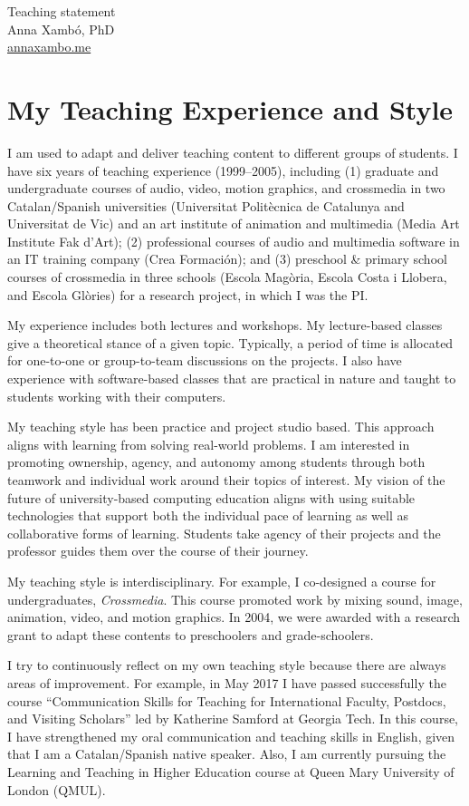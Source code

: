 \documentclass[10pt, a4paper]{article}
\begin{document}
{\LARGE Teaching statement}\\[0.2cm]
Anna Xambó, PhD\\
\href{http://annaxambo.me}{annaxambo.me}

\section*{My Teaching Experience and Style}

I am used to adapt and deliver teaching content to different groups of students. I have six years of teaching experience (1999--2005), including (1) graduate and undergraduate courses of audio, video, motion graphics, and crossmedia in two Catalan/Spanish universities (Universitat Politècnica de Catalunya and Universitat de Vic) and an art institute of animation and multimedia (Media Art Institute Fak d’Art); (2) professional courses of audio and multimedia software in an IT training company (Crea Formación); and (3) preschool \& primary school courses of crossmedia in three schools (Escola Magòria, Escola Costa i Llobera, and Escola Glòries) for a research project, in which I was the PI. 

My experience includes both lectures and workshops. My lecture-based classes give a theoretical stance of a given topic. Typically, a period of time is allocated for one-to-one or group-to-team discussions on the projects. I also have experience with software-based classes that are practical in nature and taught to students working with their computers. 

My teaching style has been practice and project studio based. This approach aligns with learning from solving real-world problems. I am interested in promoting ownership, agency, and autonomy among students through both teamwork and individual work around their topics of interest. My vision of the future of university-based computing education aligns with using suitable technologies that support both the individual pace of learning as well as collaborative forms of learning. Students take agency of their projects and the professor guides them over the course of their journey. 

My teaching style is interdisciplinary. For example, I co-designed a course for undergraduates, \emph{Crossmedia}. This course promoted work by mixing sound, image, animation, video, and motion graphics. In 2004, we were awarded with a research grant to adapt these contents to preschoolers and grade-schoolers.

I try to continuously reflect on my own teaching style because there are always areas of improvement. For example, in May 2017 I have passed successfully the course ``Communication Skills for Teaching for International Faculty, Postdocs, and Visiting Scholars'' led by Katherine Samford at Georgia Tech. In this course, I have strengthened my oral communication and teaching skills in English, given that I am a Catalan/Spanish native speaker. Also, I am currently pursuing the Learning and Teaching in Higher Education course at Queen Mary University of London (QMUL).
\end{document}
